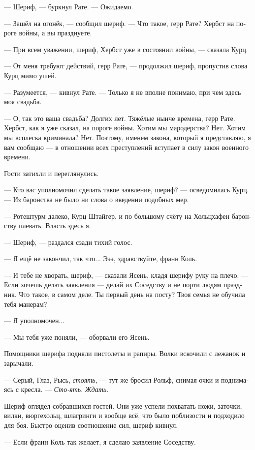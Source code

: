 \documentclass[a4paper,12pt,fleqn]{book}\usepackage{cooltooltips}\usepackage{polyglossia}\setdefaultlanguage[babelshorthands=true]{russian}\setotherlanguage{english}\defaultfontfeatures{Ligatures=TeX,Mapping=tex-text} \usepackage{xcolor}\definecolor{lightgray}{HTML}{bbbbbb}\color{lightgray}\newcommand{\ml}[3]{\textenglish{\textcolor{black}{#3}}}
\newcommand{\asterism}{\vspace{1em}{\centering\Large\bfseries$\ast~\ast~\ast$\par}\vspace{1em}}
\begin{document}
\asterism

--- Шериф, --- буркнул Рате.
--- Ожидаемо.

--- Зашёл на огонёк, --- сообщил шериф.
--- Что такое, герр Рате?
Хербст на пороге войны, а вы празднуете.

--- При всем уважении, шериф, Хербст уже в состоянии войны, --- сказала Курц.

--- От меня требуют действий, герр Рате, --- продолжил шериф, пропустив слова Курц мимо ушей.

--- Разумеется, --- кивнул Рате.
--- Только я не вполне понимаю, при чем здесь моя свадьба.

--- О, так это ваша свадьба?
Долгих лет.
Тяжёлые нынче времена, герр Рате.
Хербст, как я уже сказал, на пороге войны.
Хотим мы мародерства?
Нет.
Хотим мы всплеска криминала?
Нет.
Поэтому, именем закона, который я представляю, я вам сообщаю --- в отношении всех преступлений вступает в силу закон военного времени.

Гости затихли и переглянулись.

--- Кто вас уполномочил сделать такое заявление, шериф? --- осведомилась Курц.
--- Из баронства не было ни слова о введении подобных мер.

--- Ротештурм далеко, Курц Штайгер, и по большому счёту на Хольцхафен баронству плевать.
Власть здесь я.

--- Шериф, --- раздался сзади тихий голос.

--- Я ещё не закончил, так что...
Эээ, здравствуйте, франн Коль.

--- И тебе не хворать, шериф, --- сказали Ясень, кладя шерифу руку на плечо.
--- Если хочешь делать заявления --- делай их Соседству и не порти людям праздник.
Что такое, в самом деле.
Ты первый день на посту?
Твоя семья не обучила тебя манерам?

--- Я уполномочен...

--- Мы тебя уже поняли, --- оборвали его Ясень.

Помощники шерифа подняли пистолеты и рапиры.
Волки вскочили с лежанок и зарычали.

--- Серый, Глаз, Рысь, \textit{стоять}, --- тут же бросил Рольф, снимая очки и поднимаясь с кресла.
--- \textit{Сто-ять}.
\textit{Ждать}.

Шериф оглядел собравшихся гостей.
Они уже успели похватать ножи, заточки, вилки, вюргехольц, шлагринги и вообще всё, что было поблизости и подходило для боя.
Быстро оценив соотношение сил, шериф кивнул.

--- Если франн Коль так желает, я сделаю заявление Соседству.
\end{document}
